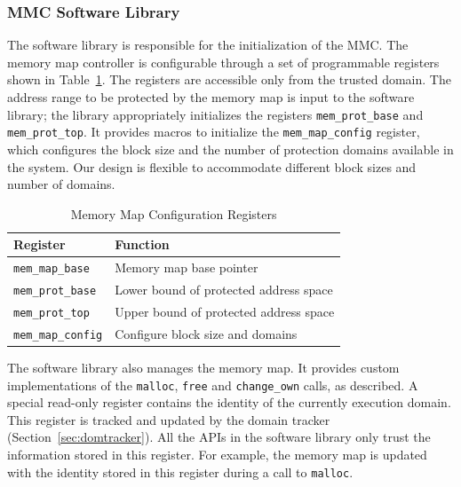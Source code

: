 \subsubsection{MMC Software Library}
\label{sec:mmc_for_protection}
%
The software library is responsible for the initialization of the MMC.
%
The memory map controller is configurable through a set of
programmable registers shown in Table~\ref{tab:mmap_config_regs}.
%
The registers are accessible only from the trusted domain.
%
The address range to be protected by the memory map is input to the
software library; the library appropriately initializes the registers
\texttt{mem\_prot\_base} and \texttt{mem\_prot\_top}.
%
It provides macros to initialize the \texttt{mem\_map\_config}
register, which configures the block size and the number of protection
domains available in the system.
%
Our design is flexible to accommodate different block sizes and number
of domains.
%
\begin{table}[htdp]
\centering
\small{
\begin{tabular}{|l|l|}
	\hline
	Register & Function\\
	\hline
	\texttt{mem\_map\_base} & Memory map base pointer \\
	\texttt{mem\_prot\_base} & Lower bound of protected address space\\
	\texttt{mem\_prot\_top} & Upper bound of protected address space\\
	\texttt{mem\_map\_config} & Configure block size and domains\\
	\hline
\end{tabular}}
\caption{Memory Map Configuration Registers}
\label{tab:mmap_config_regs}
\end{table}

The software library also manages the memory map.
%
It provides custom implementations of the \texttt{malloc},
\texttt{free} and \texttt{change\_own} calls, as described.
%
A special read-only register contains the identity of the currently
execution domain.
%
This register is tracked and updated by the domain
tracker (Section~\ref{sec:domtracker}).
%
All the APIs in the software library only trust the information stored
in this register.
%
For example, the memory map is updated with the identity stored in
this register during a call to \texttt{malloc}.
%
